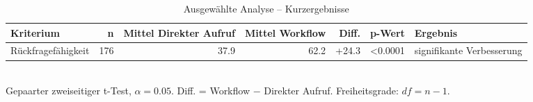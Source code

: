 \begin{table}[htbp]
\centering
\caption{Ausgewählte Analyse -- Kurzergebnisse}
\begin{tabular}{lrrrrrl}
\toprule
Kriterium & n & Mittel Direkter Aufruf & Mittel Workflow & Diff. & p-Wert & Ergebnis \\
\midrule
Rückfragefähigkeit & 176 & 37.9 & 62.2 & +24.3 & <0.0001 & signifikante Verbesserung \\
\bottomrule
\end{tabular}
\\[2mm]
\footnotesize Gepaarter zweiseitiger t-Test, $\alpha=0.05$. Diff. = Workflow $-$ Direkter Aufruf. Freiheitsgrade: $df=n-1$.
\end{table}

